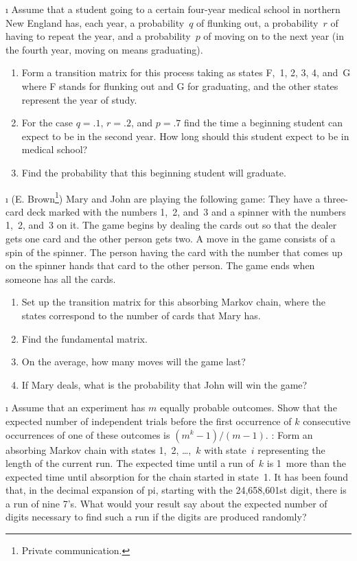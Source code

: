 \begin{LJSItem}
\i\label{exer 11.2.17} Assume that a student going to a certain four-year
medical 
school in northern New England has, each year, a probability~$q$ of flunking
out, a
probability~$r$ of having to repeat the year, and a probability~$p$ of moving
on to the next year (in the fourth year, moving on means graduating).
\begin{enumerate}
\item Form a transition matrix for this process taking as states F,~1, 2, 3,
4, and~G where F stands for flunking out and G for graduating, and the other
states represent the year of study.

\item For the case $q = .1$, $r = .2$, and $p = .7$ find the time a
beginning student can expect to be in the second year.  How long should this
student expect to be in medical school?

\item Find the probability that this beginning student will graduate.
\end{enumerate}

\i\label{exer 11.2.18} (E. Brown\footnote{Private communication.}) 
Mary and John are playing the following game: They have a  three-card deck
marked with 
the numbers 1,~2, and~3 and a spinner with the  numbers 1,~2, and~3 on it.  The
game begins by
dealing the cards out so that the dealer gets one card and the other person
gets two.  
A move in the game consists of a spin of the spinner.  The person having the
card with the
number that comes up on the spinner hands that card to the other person.  The
game ends when
someone has all the cards.  
\begin{enumerate}

\item Set up the transition matrix for this absorbing Markov chain, where the
states
correspond to the number of cards that Mary has.

\item Find the fundamental matrix.

\item On the average, how many moves will the game last?

\item If Mary deals, what is the probability that John will win the game?
\end{enumerate}

\i\label{exer 11.2.19} Assume that an experiment has $m$ equally probable
outcomes.  
Show that the expected number of independent trials before the first occurrence
of
$k$ consecutive occurrences of one of these outcomes is $(m^k - 1)/(m - 1)$. 
: Form an absorbing Markov chain with states 1,~2, \ldots,~$k$ with
state~$i$ representing the length of the current run.  The expected time until
a run of~$k$ is 1~more than the expected time until absorption for the chain
started in state~1.  It has been found that, in the decimal expansion of pi,
starting with the 24{,}658{,}601st digit, there is a run of nine 7's.  What
would your result say about the expected number of digits necessary to find
such a run if the digits are produced randomly?


\end{LJSItem}
